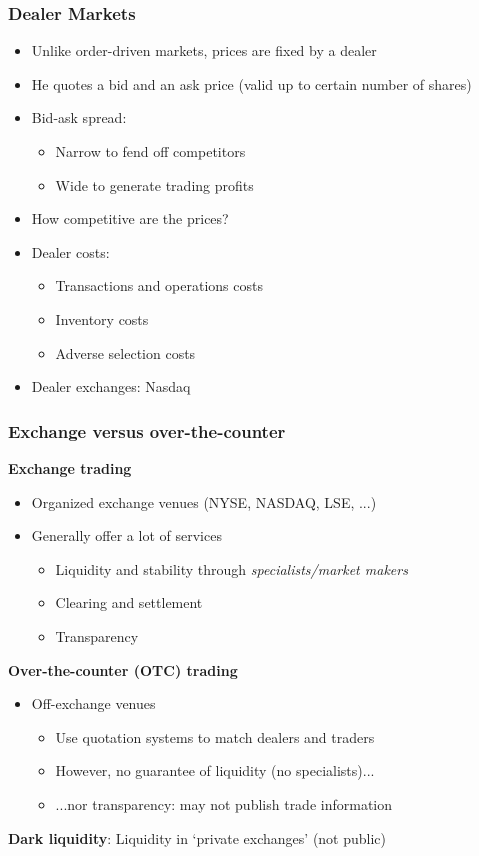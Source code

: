\documentclass[english,10pt]{beamer}
\theoremstyle{definition}
\begin{document}
\begin{frame}
\frametitle{Dealer Markets}
\begin{itemize}
	\item Unlike order-driven markets, prices are fixed by a dealer
	\item He quotes a bid and an ask price (valid up to certain number of shares)
	\item Bid-ask spread:
	\begin{itemize}
		\item Narrow to fend off competitors
		\item Wide to generate trading profits
	\end{itemize}
	\item How competitive are the prices?
	\item Dealer costs:
	\begin{itemize}
		\item Transactions and operations costs
		\item Inventory costs
		\item Adverse selection costs
	\end{itemize}
	\item Dealer exchanges: Nasdaq
\end{itemize}
\end{frame}


\begin{frame}
\frametitle{Exchange versus over-the-counter}
\textbf{Exchange trading}
\begin{itemize}
	\item Organized exchange venues (NYSE, NASDAQ, LSE, ...)
	\item Generally offer a lot of services
	\begin{itemize}
		\item Liquidity and stability through \textit{specialists/market makers}
		\item Clearing and settlement
		\item Transparency
	\end{itemize}
\end{itemize}
\textbf{Over-the-counter (OTC) trading}
\begin{itemize}
	\item Off-exchange venues
	\begin{itemize}
		\item Use quotation systems to match dealers and traders
		\item However, no guarantee of liquidity (no specialists)...
		\item ...nor transparency: may not publish trade information
	\end{itemize}
\end{itemize}
\textbf{Dark liquidity}: Liquidity in `private exchanges' (not public)
\end{frame}
\end{document}
